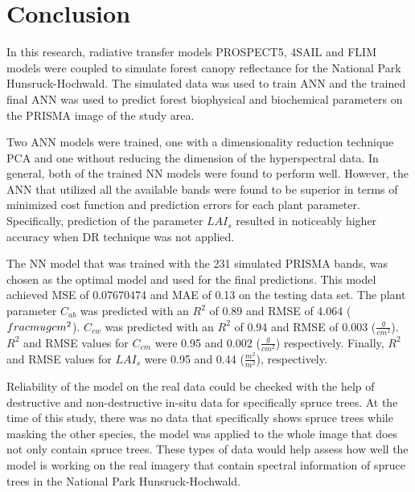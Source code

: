 \documentclass[a4paper, twoside]{templates/ociamthesis}
\begin{document}
\hypertarget{conclusion}{%
\chapter{Conclusion}\label{conclusion}}

In this research, radiative transfer models PROSPECT5, 4SAIL and FLIM models were coupled to simulate forest canopy reflectance for the National Park Hunsruck-Hochwald. The simulated data was used to train ANN and the trained final ANN was used to predict forest biophysical and biochemical parameters on the PRISMA image of the study area.

Two ANN models were trained, one with a dimensionality reduction technique PCA and one without reducing the dimension of the hyperspectral data. In general, both of the trained NN models were found to perform well. However, the ANN that utilized all the available bands were found to be superior in terms of minimized cost function and prediction errors for each plant parameter. Specifically, prediction of the parameter \(LAI_{s}\) resulted in noticeably higher accuracy when DR technique was not applied.

The NN model that was trained with the 231 simulated PRISMA bands, was chosen as the optimal model and used for the final predictions. This model achieved MSE of 0.07670474 and MAE of 0.13 on the testing data set. The plant parameter \(C_{ab}\) was predicted with an \(R^2\) of 0.89 and RMSE of 4.064 (\(\\frac{\\mu g}{cm^2}\)). \(C_{cw}\) was predicted with an \(R^2\) of 0.94 and RMSE of 0.003 (\(\frac{g}{cm^2}\)). \(R^2\) and RMSE values for \(C_{cm}\) were 0.95 and 0.002 (\(\frac{g}{cm^2}\)) respectively. Finally, \(R^2\) and RMSE values for \(LAI_{s}\) were 0.95 and 0.44 (\(\frac{m^2}{m^2}\)), respectively.

Reliability of the model on the real data could be checked with the help of destructive and non-destructive in-situ data for specifically spruce trees. At the time of this study, there was no data that specifically shows spruce trees while masking the other species, the model was applied to the whole image that does not only contain spruce trees. These types of data would help assess how well the model is working on the real imagery that contain spectral information of spruce trees in the National Park Hunsruck-Hochwald.






\end{document}
